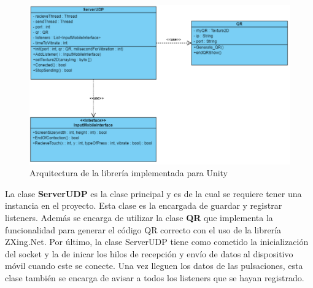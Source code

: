 \begin{figure}[h]
\centering
\includegraphics[width=1.0\textwidth]{Imagenes/Bitmap/Arquitectura_Unity.png}
\caption{Arquitectura de la librer\'ia implementada para Unity}
 \label{Unityr}
\end{figure}

La clase \textbf{ServerUDP} es la clase principal y es de la cual se requiere tener una instancia en el proyecto. Esta clase es la encargada de guardar y registrar listeners. Adem\'as se encarga de utilizar la clase \textbf{QR} que implementa la funcionalidad para generar el c\'odigo QR correcto con el uso de la librer\'ia ZXing.Net. Por \'ultimo, la clase ServerUDP tiene como  cometido la inicializaci\'on del socket y la de inicar los hilos de recepci\'on y env\'io de datos al dispositivo m\'ovil cuando este se conecte. Una vez lleguen los datos de las pulsaciones, esta clase tambi\'en se encarga de avisar a todos los listeners que se hayan registrado.

